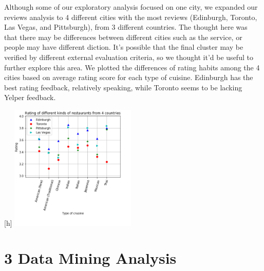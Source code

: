 \documentclass{neu_handout}
\begin{document}
Although some of our exploratory analysis focused on one city, we expanded our reviews analysis to 4 different cities with the most reviews (Edinburgh, Toronto, Las Vegas, and Pittsburgh), from 3 different countries. The thought here was that there may be differences between different cities such as the service, or people may have different diction. It's possible that the final cluster may be verified by different external evaluation criteria, so we thought it'd be useful to further explore this area. We plotted the differences of rating habits among the 4 cities based on average rating score for each type of cuisine. Edinburgh has the best rating feedback, relatively speaking, while Toronto seems to be lacking Yelper feedback.

\begin{center}[h]
	\includegraphics[width=60mm,scale=0.5]{Rating_different_restaurants_countries.png}
\end{center}

\section*{3 Data Mining Analysis}
\end{document}
